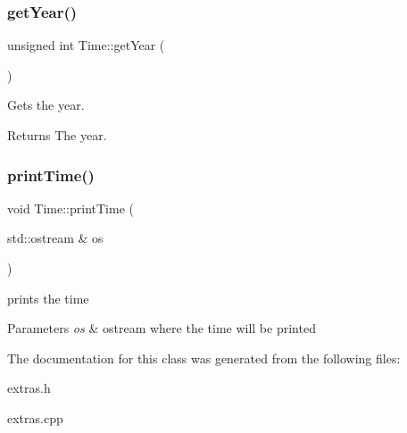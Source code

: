 \subsubsection{\texorpdfstring{get\+Year()}{getYear()}}
{\footnotesize\ttfamily unsigned int Time\+::get\+Year (\begin{DoxyParamCaption}{ }\end{DoxyParamCaption})}



Gets the year. 

\begin{DoxyReturn}{Returns}
The year. 
\end{DoxyReturn}
\mbox{\label{classTime_a79d96e150ff808580fdf43932897130d}} 
\subsubsection{\texorpdfstring{print\+Time()}{printTime()}}
{\footnotesize\ttfamily void Time\+::print\+Time (\begin{DoxyParamCaption}\item[{std\+::ostream \&}]{os }\end{DoxyParamCaption})}



prints the time 


\begin{DoxyParams}{Parameters}
{\em os} & ostream where the time will be printed \\
\hline
\end{DoxyParams}


The documentation for this class was generated from the following files\+:\begin{DoxyCompactItemize}
\item 
extras.\+h\item 
extras.\+cpp\end{DoxyCompactItemize}
